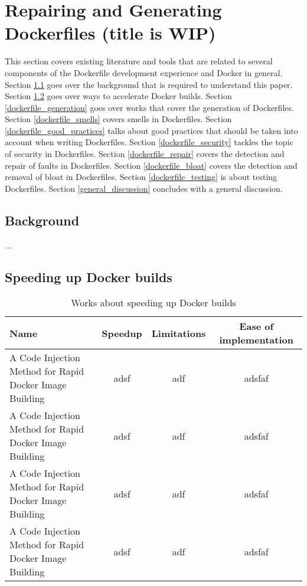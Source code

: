 \chapter{Repairing and Generating Dockerfiles (title is WIP)} \label{chap:sota}

This section covers existing literature and tools that are related to several components of the Dockerfile development experience and Docker in general. Section \ref{background} goes over the background that is required to understand this paper. Section \ref{speeding_up_docker_builds} goes over ways to accelerate Docker builds. Section \ref{dockerfile_generation} goes over works that cover the generation of Dockerfiles. Section \ref{dockerfile_smells} covers smells in Dockerfiles. Section \ref{dockerfile_good_practices} talks about good practices that should be taken into account when writing Dockerfiles. Section \ref{dockerfile_security} tackles the topic of security in Dockerfiles. Section \ref{dockerfile_repair} covers the detection and repair of faults in Dockerfiles. Section \ref{dockerfile_bloat} covers the detection and removal of bloat in Dockerfiles. Section \ref{dockerfile_testing} is about testing Dockerfiles. Section \ref{general_discussion} concludes with a general discussion.

\section{Background} \label{background}
...
\section{Speeding up Docker builds} \label{speeding_up_docker_builds}

\begin{table}[H]
    \centering
    \begin{tabular}{|p{}|c|c|c|}
        \hline \textbf{Name} & \textbf{Speedup} & \textbf{Limitations} & \textbf{Ease of implementation} \\
        \hline A Code Injection Method for Rapid Docker Image Building \citep{wangCodeInjectionMethod2019} & adsf & adf & adsfaf \\
        \hline A Code Injection Method for Rapid Docker Image Building \citep{wangCodeInjectionMethod2019} & adsf & adf & adsfaf \\
        \hline A Code Injection Method for Rapid Docker Image Building \citep{wangCodeInjectionMethod2019} & adsf & adf & adsfaf \\
        \hline A Code Injection Method for Rapid Docker Image Building \citep{wangCodeInjectionMethod2019} & adsf & adf & adsfaf \\
        \hline
    \end{tabular} 
    \caption{Works about speeding up Docker builds}
    \label{tab:works_speeding_up}
\end{table}



